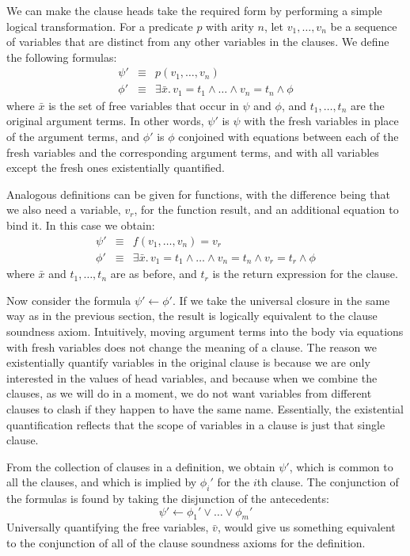We can make the clause heads take the required form
by performing a simple logical transformation.
For a predicate $p$ with arity $n$,
let $v_1, \ldots, v_n$ be a sequence of variables
that are distinct from any other variables in the clauses.
We define the following formulas:
\begin{eqnarray*}
\psi' & \equiv & p(v_1, \ldots, v_n) \\
\phi' & \equiv &
    \exists \bar{x}.\, v_1 = t_1 \land \ldots \land v_n = t_n \land \phi
\end{eqnarray*}
where $\bar{x}$ is the set of free variables
that occur in $\psi$ and $\phi$,
and $t_1, \ldots, t_n$ are the original argument terms.
In other words,
$\psi'$ is $\psi$ with the fresh variables
in place of the argument terms,
and $\phi'$ is $\phi$ conjoined with
equations between each of the fresh variables
and the corresponding argument terms,
and with all variables except the fresh ones existentially quantified.

Analogous definitions can be given for functions,
with the difference being that
we also need a variable, $v_r$, for the function result,
and an additional equation to bind it.
In this case we obtain:
\begin{eqnarray*}
\psi' & \equiv & f(v_1, \ldots, v_n) = v_r \\
\phi' & \equiv &
    \exists \bar{x}.\, v_1 = t_1 \land \ldots \land v_n = t_n
    \land v_r = t_r \land \phi
\end{eqnarray*}
where $\bar{x}$ and $t_1, \ldots, t_n$ are as before,
and $t_r$ is the return expression for the clause.

Now consider the formula $\psi' \leftarrow \phi'$.
If we take the universal closure
in the same way as in the previous section,
the result is logically equivalent to
the clause soundness axiom.
Intuitively,
moving argument terms into the body
via equations with fresh variables
does not change the meaning of a clause.
The reason we existentially quantify
variables in the original clause
is because we are only interested in
the values of head variables,
and because when we combine the clauses,
as we will do in a moment,
we do not want variables from different clauses
to clash if they happen to have the same name.
Essentially, the existential quantification
reflects that the scope of variables in a clause
is just that single clause.

From the collection of clauses in a definition,
we obtain $\psi'$, which is common to all the clauses,
and which is implied by $\phi_i'$ for the $i$th clause.
The conjunction of the formulas is found by
taking the disjunction of the antecedents:
\[
    \psi' \leftarrow \phi_1' \lor \ldots \lor \phi_m'
\]
Universally quantifying the free variables, $\bar{v}$,
would give us something equivalent to
the conjunction of all of the clause soundness axioms
for the definition.



